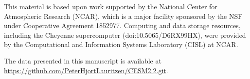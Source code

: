 \documentclass[draft]{agujournal2019}
\begin{document}
%
%
%
%
%
%
%
%


\acknowledgments
This material is based upon work supported by the National Center for Atmospheric Research (NCAR), which is a major facility sponsored by the NSF under Cooperative Agreement 1852977. Computing and data storage resources, including the Cheyenne supercomputer
(doi:10.5065/D6RX99HX), were provided by the Computational and Information Systems Laboratory (CISL) at NCAR.

The data presented in this manuscript is available at {\url{https://github.com/PeterHjortLauritzen/CESM2.2.git}}.




%
%

%



%
%
%
%
%
\end{document}
